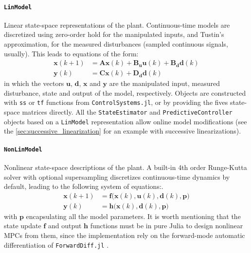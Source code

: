 \paragraph{\textnormal{\texttt{LinModel}}}
Linear state-space representations of the plant. Continuous-time models are discretized using zero-order hold for the manipulated inputs, and Tustin's approximation, for the measured disturbances (sampled continuous signals, usually). This leads to equations of the form:
\begin{subequations}
\begin{align}
    \mathbf{x}(k+1) &= \mathbf{A x}(k) + \mathbf{B_u u}(k) + \mathbf{B_d d}(k) \\
    \mathbf{y}(k)   &= \mathbf{C x}(k) + \mathbf{D_d d}(k)
\end{align}
\end{subequations}
in which the vectors $\mathbf{u}$, $\mathbf{d}$, $\mathbf{x}$ and $\mathbf{y}$ are the manipulated input, measured disturbance, state and output of the model, respectively. Objects are constructed with \texttt{ss} or \texttt{tf} functions from \texttt{ControlSystems.jl}, or by providing the fives state-space matrices directly. All the \texttt{StateEstimator} and \texttt{PredictiveController} objects based on a \texttt{LinModel} representation allow online model modifications (see the \cref{sec:successive_linearization} for an example with successive linearizations).

\paragraph{\textnormal{\texttt{NonLinModel}}}
Nonlinear state-space descriptions of the plant. A built-in 4th order Runge-Kutta solver with optional supersampling discretizes continuous-time dynamics by default, leading to the following system of equations:. 
\begin{subequations}
\begin{align}
    \mathbf{x}(k+1) &= \mathbf{f}\big(\mathbf{x}(k), \mathbf{u}(k), \mathbf{d}(k), \mathbf{p} \big) \\
    \mathbf{y}(k)   &= \mathbf{h}\big( \mathbf{x}(k), \mathbf{d}(k), \mathbf{p} \big)
\end{align}
\end{subequations}
with $\mathbf{p}$ encapsulating all the model parameters. It is worth mentioning that the state update $\mathbf{f}$ and output $\mathbf{h}$ functions must be in pure Julia to design nonlinear MPCs from them, since the implementation rely on the forward-mode automatic differentiation of \texttt{ForwardDiff.jl} \citep{forwardDiff}.

